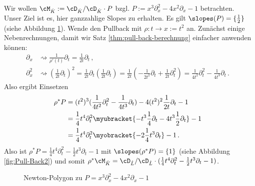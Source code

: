 \begin{exmp}\label{exmp:Pull-Back}
Wir wollen $\cM_{\hat K}:=\cD_{\hat K}/\cD_{\hat K}\cdot P$ bzgl. $P:=
x^3\partial_x^2-4x^2\partial_x-1$ betrachten.
Unser Ziel ist es, hier ganzzahlige Slopes zu erhalten.
Es gilt $\slopes(P)=\{\frac{1}{2}\}$ (siehe Abbildung \ref{fig:Pull-Back1}).
Wende den Pullback mit $\rho:t\rightarrow x:=t^2$ an.
Zunächst einige Nebenrechnungen, damit wir Satz
\ref{thm:pull-back-berechnung} einfacher anwenden können:
\begin{align*}
\partial_x   &\rightsquigarrow
  \frac{1}{\rho'(t)}\partial_t=\frac{1}{2t}\partial_t \,,
\\\partial_x^2 &\rightsquigarrow (\frac{1}{2t}\partial_t)^2
  = \frac{1}{2t}\partial_t (\frac{1}{2t}\partial_t)
  = \frac{1}{2t}(-\frac{1}{2t^2}\partial_t + \frac{1}{2t}\partial_t^2)
  = \frac{1}{4t^2}\partial_t^2-\frac{1}{4t^3}\partial_t \,.
\end{align*}
Also ergibt Einsetzen
\begin{align*}
\rho^*P &= (t^2)^3(\frac{1}{4t^2}\partial_t^2-\frac{1}{4t^3}\partial_t)-
    4(t^2)^2\frac{1}{2t}\partial_t-1
\\&= \frac{1}{4}t^4\partial_t^2 \myubracket{-t^3\frac{1}{4}\partial_t-
    4t^{3}\frac{1}{2}\partial_t}-1
\\&= \frac{1}{4}t^4\partial_t^2 \myobracket{-2\frac{1}{4}t^3\partial_t}-1 \,.
\end{align*}
%
Also ist $\rho^*P= \frac{1}{4}t^4\partial_t^2 -\frac{1}{2}t^3\partial_t-1$ mit
$ \slopes(\rho^*P)=\{1\} $ (siehe Abbildung \ref{fig:Pull-Back2}) und somit
$\rho^*\cM_{\hat K}=\cD_{\hat L}/\cD_{\hat L}
\cdot(\frac{1}{4}t^4\partial_t^2-\frac{1}{2}t^3\partial_t-1)$.
\begin{figure}[htbp]
  \begin{minipage}[hbt]{0,49\textwidth}
  \begin{center}
  \end{center}
  \caption[Newton-Polygon zu $P=x^3\partial_x^2-4x^2\partial_x-1$]
    {Newton-Polygon zu \newline $P=x^3\partial_x^2-4x^2\partial_x-1$}
  \label{fig:Pull-Back1}
  \end{minipage}

\end{figure}
\end{exmp}
